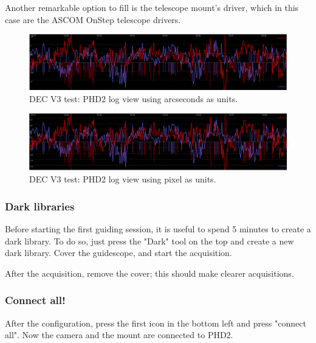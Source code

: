 \documentclass{article}
\begin{document}
\begin{multicols}{2}
        Another remarkable option to fill is the telescope mount's driver, which in this case are the ASCOM OnStep telescope drivers.

        \begin{figure}[t]
            \centering
            \includegraphics[scale=0.45]{analysis/PHD2/2021-12-09/guide-11-arcsec.png}
            \caption{DEC V3 test: PHD2 log view using arcseconds as units.}
            \label{fig:guide-11-arcsec}
        \end{figure}
        \begin{figure}[t]
            \centering
            \includegraphics[scale=0.45]{analysis/PHD2/2021-12-09/guide-11-pixel.png}
            \caption{DEC V3 test: PHD2 log view using pixel as units.}
            \label{fig:guide-11-pixel}
        \end{figure}
        
        \subsubsection{Dark libraries}
        Before starting the first guiding session, it is useful to spend 5 minutes to create a dark library.
        To do so, just press the "Dark" tool on the top and create a new dark library.
        Cover the guidescope, and start the acquisition.

        After the acquisition, remove the cover;
        this should make clearer acquisitions.

        \subsubsection{Connect all!}
        After the configuration, press the first icon in the bottom left and press "connect all".
        Now the camera and the mount are connected to PHD2.


\end{multicols}
\end{document}
